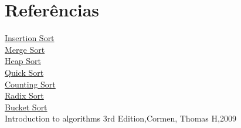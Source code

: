 \documentclass[12pt,a4paper,twoside]{report}
\begin{document}
%
%

\chapter{Referências}
\href{https://pt.wikipedia.org/wiki/Insertion_sort}{Insertion Sort}\\
\href{https://pt.wikipedia.org/wiki/Merge_sort}{Merge Sort}\\
\href{https://pt.wikipedia.org/wiki/Heapsort}{Heap Sort}\\
\href{https://en.wikipedia.org/wiki/Quicksort}{Quick Sort}\\
\href{https://pt.wikipedia.org/wiki/Counting_sort}{Counting Sort}\\
\href{https://en.wikipedia.org/wiki/Radix_sort}{Radix Sort}\\
\href{https://en.wikipedia.org/wiki/Bucket_sort}{Bucket Sort}\\
Introduction to algorithms 3rd Edition,Cormen, Thomas H,2009
  
\end{document}
